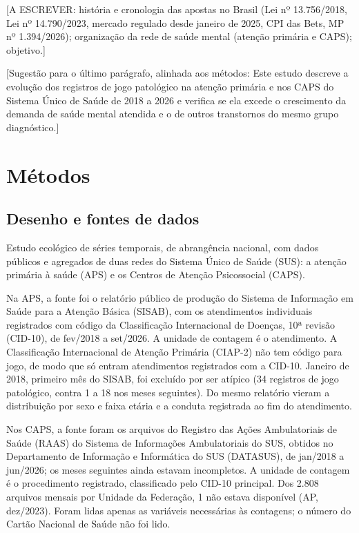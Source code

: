 \documentclass[12pt,a4paper]{article}
\newcommand{\pendente}[1]{{\color{orange}[#1]}}
\begin{document}
\pendente{A ESCREVER: história e cronologia das apostas no Brasil (Lei nº 13.756/2018, Lei nº 14.790/2023, mercado regulado desde janeiro de 2025, CPI das Bets, MP nº 1.394/2026); organização da rede de saúde mental (atenção primária e CAPS); objetivo.}

\pendente{Sugestão para o último parágrafo, alinhada aos métodos: Este estudo descreve a evolução dos registros de jogo patológico na atenção primária e nos CAPS do Sistema Único de Saúde de 2018 a 2026 e verifica se ela excede o crescimento da demanda de saúde mental atendida e o de outros transtornos do mesmo grupo diagnóstico.}

\section{Métodos}

\subsection{Desenho e fontes de dados}

Estudo ecológico de séries temporais, de abrangência nacional, com dados públicos e agregados de duas redes do Sistema Único de Saúde (SUS): a atenção primária à saúde (APS) e os Centros de Atenção Psicossocial (CAPS).

Na APS, a fonte foi o relatório público de produção do Sistema de Informação em Saúde para a Atenção Básica (SISAB)\citep{sisab}, com os atendimentos individuais registrados com código da Classificação Internacional de Doenças, 10ª revisão (CID-10), de fev/2018 a set/2026. A unidade de contagem é o atendimento. A Classificação Internacional de Atenção Primária (CIAP-2) não tem código para jogo, de modo que só entram atendimentos registrados com a CID-10. Janeiro de 2018, primeiro mês do SISAB, foi excluído por ser atípico (34 registros de jogo patológico, contra 1 a 18 nos meses seguintes). Do mesmo relatório vieram a distribuição por sexo e faixa etária e a conduta registrada ao fim do atendimento.

Nos CAPS, a fonte foram os arquivos do Registro das Ações Ambulatoriais de Saúde (RAAS) do Sistema de Informações Ambulatoriais do SUS, obtidos no Departamento de Informação e Informática do SUS (DATASUS)\citep{datasus}, de jan/2018 a jun/2026; os meses seguintes ainda estavam incompletos. A unidade de contagem é o procedimento registrado, classificado pelo CID-10 principal. Dos 2.808 arquivos mensais por Unidade da Federação, 1 não estava disponível (AP, dez/2023). Foram lidas apenas as variáveis necessárias às contagens; o número do Cartão Nacional de Saúde não foi lido.
\end{document}
